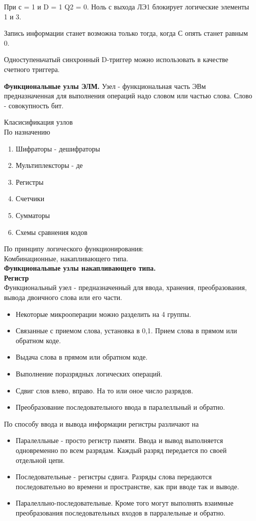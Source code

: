 При с = 1 и D = 1
Q2 = 0. Ноль с выхода ЛЭ1 блокирует логические элементы 1 и 3.

Запись информации станет возможна только тогда, когда С опять станет равным 0.

Одноступеньчатый синхронный D-триггер можно использовать в качестве счетного триггера.


\textbf{Функциональные узлы ЭЛМ. }
Узел - функциональная часть ЭВм предназначенная для выполнения операций надо словом или частью слова.
Слово - совокупность бит.

Класисификация узлов \\
По назначению
\begin{enumerate}
  \item Шифраторы - дешифраторы
  \item Мультиплексторы - де
  \item Регистры
  \item Счетчики
  \item Сумматоры
  \item Схемы сравнения кодов
\end{enumerate}
По принципу логического функционирования:\\
Комбинационные, накапливающего типа.\\

\textbf{Функциональные узлы накапливающего типа.}\\
\textbf{Регистр}\\
Функциональный узел - предназначенный для ввода, хранения, преобразования, вывода двоичного слова или его части.\\
\begin{itemize}
\item Некоторые микрооперации можно разделить на 4 группы. \\
\item Связанные с приемом слова, установка в 0,1. Прием слова в прямом или обратном коде.\\
\item Выдача слова в прямом или обратном коде.\\
\item Выполнение поразрядных логических операций.\\
\item Сдвиг слов влево, вправо. На то или оное число разрядов.
\item Преобразование последовательного ввода в паралелльный и обратно.


\end{itemize}
По способу ввода и вывода информации регистры различают на \\
\begin{itemize}
\item Паралелльные - просто регистр памяти.
Ввода и вывод выполняется одновременно по всем разрядам. Каждый разряд передается по своей отдельной цепи.
\item Последовательные - регистры сдвига.
Разряды слова передаются последовательно во времени и пространстве, как при вводе так и выводе.
\item Паралелльно-последовательные. Кроме того могут выполнять взаимные преобразования последовательных входов в парралельные и обратно.
\end{itemize}

